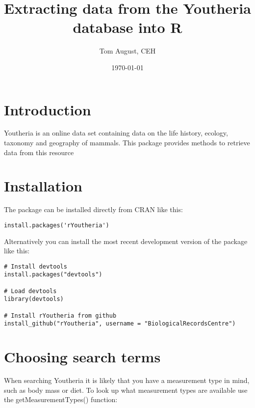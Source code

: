 \documentclass[a4paper]{article}\usepackage[]{graphicx}\usepackage[]{color}
\begin{document}
\title{Extracting data from the Youtheria database into R}
\author{Tom August, CEH}
\date\today
\maketitle
\section{Introduction}
Youtheria is an online data set containing data on the life history, ecology, taxonomy and geography of mammals. This package provides methods to retrieve data from this resource

\section{Installation}
The package can be installed directly from CRAN like this:

\begin{verbatim}
install.packages('rYoutheria')
\end{verbatim}

Alternatively you can install the most recent development version of the package like this:

\begin{verbatim}
# Install devtools
install.packages("devtools")

# Load devtools
library(devtools)

# Install rYoutheria from github
install_github("rYoutheria", username = "BiologicalRecordsCentre")
\end{verbatim}

\section{Choosing search terms}
When searching Youtheria it is likely that you have a measurement type in mind, such as body mass or diet. To look up what measurement types are available use the getMeasurementTypes() function:
\end{document}
